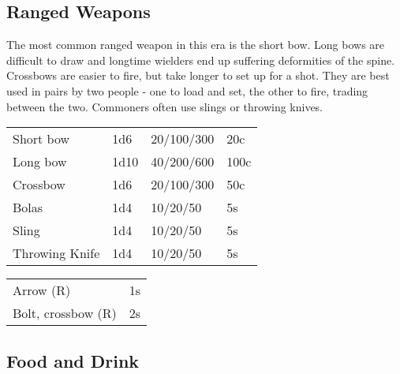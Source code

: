 \subsection{Ranged Weapons}

The most common ranged weapon in this era is the short bow. Long bows
are difficult to draw and longtime wielders end up suffering deformities
of the spine. Crossbows are easier to fire, but take longer to set up for
a shot. They are best used in pairs by two people - one to load and set,
the other to fire, trading between the two. Commoners often use slings or
throwing knives.

\begin{center}
{
\begin{xtabular}{|l|l|l|l|}
Short bow & 1d6 & 20/100/300 & 20c \\
Long bow & 1d10 & 40/200/600 & 100c \\
Crossbow & 1d6 & 20/100/300 & 50c \\
Bolas & 1d4 & 10/20/50 & 5s \\
Sling & 1d4 & 10/20/50 & 5s \\
Throwing Knife & 1d4 & 10/20/50 & 5s \\
\hline
\end{xtabular}
}
\end{center}

\begin{center}
{
\begin{xtabular}{|l|l|}
Arrow (R) & 1s \\
Bolt, crossbow (R) & 2s \\
\hline
\end{xtabular}
}
\end{center}

\subsection{Food and Drink}

